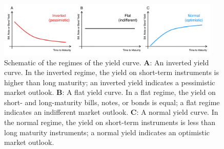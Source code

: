 \documentclass[11pt]{article}
\theoremstyle{definition}
\begin{document}
\begin{figure}[h]
    \centering
    \includegraphics[width=0.95\textwidth]{./figs/Fig-YieldCurve-Schematic.pdf}
    \caption{Schematic of the regimes of the yield curve. 
	\textbf{A}: An inverted yield curve. In the inverted regime, the yield on short-term instruments is higher than long maturity; an inverted yield indicates a pessimistic market outlook.
	\textbf{B}: A flat yield curve. In a flat regime, the yield on short- and long-maturity bills, notes, or bonds is equal; a flat regime indicates an indifferent market outlook. 
	\textbf{C}: A normal yield curve. In the normal regime, the yield on short-term instruments is less than long maturity instruments; a normal yield indicates an optimistic market outlook. 
	}\label{fig:yield-curve-schematic}
\end{figure}
\end{document}

